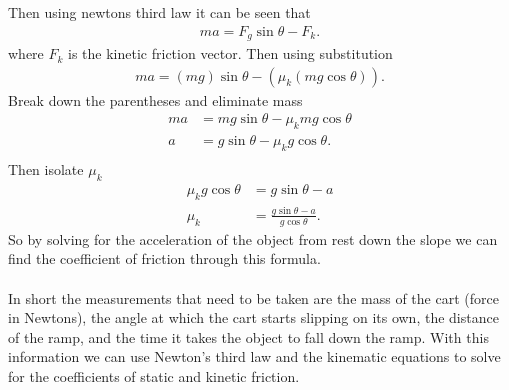 \documentclass{article}
\begin{document}
    Then using newtons third law it can be seen that
    \begin{align*}
        ma = F_g\sin\theta - F_k.
    \end{align*}
    where $F_k$ is the kinetic friction vector. Then using substitution
    \begin{align*}
        ma = (mg)\sin\theta - (\mu_k(mg\cos\theta)).
    \end{align*}
    Break down the parentheses and eliminate mass
    \begin{align*}
        ma &= mg\sin\theta - \mu_kmg\cos\theta\\
        a &= g\sin\theta - \mu_kg\cos\theta.\\
    \end{align*}
    Then isolate $\mu_k$
    \begin{align*}
        \mu_kg\cos\theta &= g\sin\theta - a\\
        \mu_k &= \frac{g\sin\theta - a}{g\cos\theta}.
    \end{align*}
    So by solving for the acceleration of the object from rest down the slope we can find the coefficient of friction through this formula.\\
    \\
    In short the measurements that need to be taken are the mass of the cart (force in Newtons), the angle at which the cart starts slipping on its own, the distance of the ramp, and the time it takes the object to fall down the ramp. With this information we can use Newton's third law and the kinematic equations to solve for the coefficients of static and kinetic friction.
\end{document}
